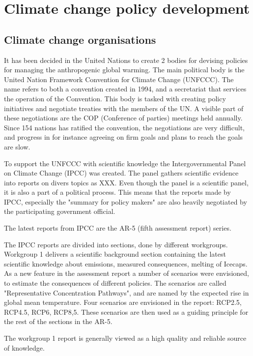 \section{Climate change policy development}\label{politics}
\subsection{Climate change organisations}
It has been decided in the United Nations to create 2 bodies for devising policies for managing the anthropogenic global warming. The main political body is the United Nation Framework Convention for Climate Change (UNFCCC). The name refers to both a convention created in 1994, and a secretariat that services the operation of the Convention. This body is tasked with creating policy initiatives and negotiate treaties with the members of the UN. A visible part of these negotiations are the COP (Conference of parties) meetings held annually. Since 154 nations has ratified the convention, the negotiations are very difficult, and progress in for instance agreeing on firm goals and plans to reach the goals are slow.

To support the UNFCCC with scientific knowledge the Intergovernmental Panel on Climate Change (IPCC) was created. The panel gathers scientific evidence into reports on divers topics as XXX.
Even though the panel is a scientific panel, it is also a part of a political process. This means that the reports made by IPCC, especially the "summary for policy makers" are also heavily negotiated by the participating government official.

The latest reports from IPCC are the AR-5 (fifth assessment report) series.

The IPCC reports are divided into sections, done by different workgroups. Workgroup 1 delivers a scientific background section containing the latest scientific knowledge about emissions, measured consequences, melting of Icecaps. As a new feature in the assessment report a number of scenarios were envisioned, to estimate the consequences of different policies. The scenarios are called "Representative Concentration Pathways", and are named by the expected rise in global mean temperature. Four scenarios are envisioned in the report: RCP2.5, RCP4.5, RCP6, RCP8,5. These scenarios are then used as a guiding principle for the rest of the sections in the AR-5.

The workgroup 1 report is generally viewed as a high quality and reliable source of knowledge.

